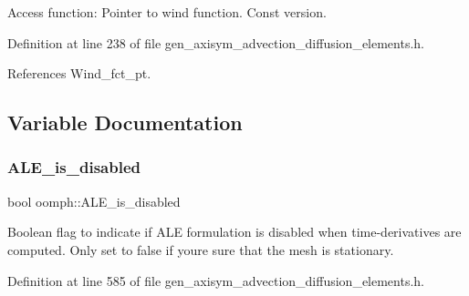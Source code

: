 Access function\+: Pointer to wind function. Const version. 

Definition at line 238 of file gen\+\_\+axisym\+\_\+advection\+\_\+diffusion\+\_\+elements.\+h.



References Wind\+\_\+fct\+\_\+pt.



\subsection{Variable Documentation}
\mbox{\label{namespaceoomph_ae5302eaf07e49e53147c42e2e6450eff}} 
\subsubsection{\texorpdfstring{A\+L\+E\+\_\+is\+\_\+disabled}{ALE\_is\_disabled}}
{\footnotesize\ttfamily bool oomph\+::\+A\+L\+E\+\_\+is\+\_\+disabled\hspace{0.3cm}{\ttfamily [protected]}}



Boolean flag to indicate if A\+LE formulation is disabled when time-\/derivatives are computed. Only set to false if you\textquotesingle{}re sure that the mesh is stationary. 



Definition at line 585 of file gen\+\_\+axisym\+\_\+advection\+\_\+diffusion\+\_\+elements.\+h.



